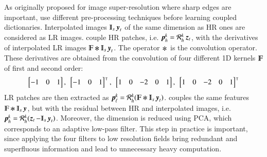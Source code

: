 As originally proposed for image super-resolution where sharp edges are important, \citet{yang2010image,yang2012coupled,zeyde2012single} use different pre-processing techniques before learning coupled dictionaries. Interpolated images $ \Interp_s\y_t $ of the same dimension as HR ones are considered as LR images. \citet{yang2010image,yang2012coupled} couple HR patches, i.e. $ \operatorname{\mathit{\operatorname{\boldsymbol{p}}_h^{k}}}=\operatorname{\mathit{\mathcal{R}_h^{k}}}\operatorname{\boldsymbol{z}}_t$,  with the derivatives of interpolated LR images $ \varmathbb{F} \Conv \Interp_s\y_t $. The operator $ \Conv $ is the convolution operator. These derivatives are obtained from the convolution of four different 1D kernels $ \varmathbb{F} $ of first and second order:
\begin{equation}
	\left[ \begin{matrix} -1 & 0 & 1 \end{matrix} \right] , \:\: \left[ \begin{matrix} -1 & 0 & 1 \end{matrix} \right]^{\intercal} , \:\: \left[ \begin{matrix} 1 & 0 & -2 & 0 & 1 \end{matrix} \right] , \:\: \left[ \begin{matrix} 1 & 0 & -2 & 0 & 1 \end{matrix} \right]^{\intercal}
\label{eq:jointlearning8}
\end{equation}
LR patches are then extracted as $\patchlow{k}= \extracthigh{k}(\varmathbb{F} \Conv \Interp_s\y_t) $. \citet{zeyde2012single} couples the same features $ \varmathbb{F} \Conv \Interp_s\y $, but with the residual between HR and interpolated images, i.e. $ \patchhigh{k}=\extracthigh{k}(\z_t-\Interp_s\y_t) $. Moreover, the dimension is reduced using PCA, which corresponds to an adaptive low-pass filter. This step in practice is important, since applying the four filters to low resolution fields bring redundant and superfluous information and lead to unnecessary heavy computation. 

